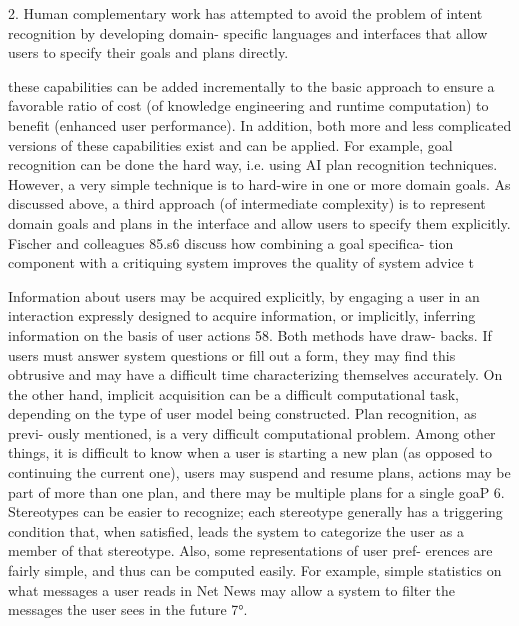 2. Human complementary work has attempted to avoid the problem of intent recognition by developing domain- specific languages and interfaces that allow users to specify their goals and plans directly.


these capabilities can be added incrementally to the basic approach to ensure a favorable ratio of cost (of knowledge engineering and runtime computation) to benefit (enhanced user performance). In addition, both more and less complicated versions of these capabilities exist and can be applied. For example, goal recognition can be done the hard way, i.e. using AI plan recognition techniques. However, a very simple technique is to hard-wire in one or more domain goals. As discussed above, a third approach (of intermediate complexity) is to represent domain goals and plans in the interface and allow users to specify them explicitly. Fischer and colleagues 85.s6 discuss how combining a goal specifica- tion component with a critiquing system improves the quality of system advice t


Information about users may be acquired explicitly, by engaging a user in an interaction expressly designed to acquire information, or implicitly, inferring information on the basis of user actions 58. Both methods have draw- backs. If users must answer system questions or fill out a form, they may find this obtrusive and may have a difficult time characterizing themselves accurately. On the other hand, implicit acquisition can be a difficult computational task, depending on the type of user model being constructed. Plan recognition, as previ- ously mentioned, is a very difficult computational problem. Among other things, it is difficult to know when a user is starting a new plan (as opposed to continuing the current one), users may suspend and resume plans, actions may be part of more than one plan, and there may be multiple plans for a single goaP 6. Stereotypes can be easier to recognize; each stereotype generally has a triggering condition that, when satisfied, leads the system to categorize the user as a member of that stereotype. Also, some representations of user pref- erences are fairly simple, and thus can be computed easily. For example, simple statistics on what messages a user reads in Net News may allow a system to filter the messages the user sees in the future 7°.


